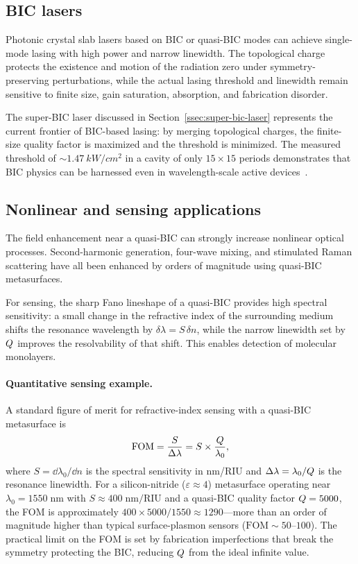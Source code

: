 \subsection{BIC lasers}
\label{ssec:bic-lasers}

Photonic crystal slab lasers based on BIC or quasi-BIC modes can achieve
single-mode lasing with high power and narrow linewidth. The topological
charge protects the existence and motion of the radiation zero under
symmetry-preserving perturbations, while the actual lasing threshold and
linewidth remain sensitive to finite size, gain saturation, absorption,
and fabrication disorder.

The super-BIC laser discussed in Section~\ref{ssec:super-bic-laser}
represents the current frontier of BIC-based lasing: by merging
topological charges, the finite-size quality factor is maximized
and the threshold is minimized. The measured threshold of
$\sim\SI{1.47}{kW/cm^2}$ in a cavity of only $15 \times 15$ periods
demonstrates that BIC physics can be harnessed even in wavelength-scale
active devices~\cite{hwang2021ultralow}.

\subsection{Nonlinear and sensing applications}
\label{ssec:bic-applications}

The field enhancement near a quasi-BIC can strongly increase
nonlinear optical processes. Second-harmonic generation, four-wave
mixing, and stimulated Raman scattering have all been enhanced by orders
of magnitude using quasi-BIC metasurfaces.

For sensing, the sharp Fano lineshape of a quasi-BIC provides high
spectral sensitivity: a small change in the refractive index of the
surrounding medium shifts the resonance wavelength by
$\delta\lambda=S\,\delta n$, while the narrow linewidth set by $Q$
improves the resolvability of that shift. This enables detection of
molecular monolayers.

\paragraph{Quantitative sensing example.}
A standard figure of merit for refractive-index sensing with a
quasi-BIC metasurface is
\begin{equation}
 \mathrm{FOM} = \frac{S}{\Delta\lambda} = S \times \frac{Q}{\lambda_0},
 \label{eq:bic-fom}
\end{equation}
where $S = \dd\lambda_0/\dd n$ is the spectral sensitivity in nm/RIU
and $\Delta\lambda = \lambda_0/Q$ is the resonance linewidth.
For a silicon-nitride ($\varepsilon \approx 4$) metasurface operating
near $\lambda_0 = 1550\;\mathrm{nm}$ with $S \approx 400\;\mathrm{nm/RIU}$
and a quasi-BIC quality factor $Q = 5000$, the FOM is approximately
$400 \times 5000/1550 \approx 1290$---more than an order of magnitude
higher than typical surface-plasmon sensors ($\mathrm{FOM} \sim 50$--$100$).
The practical limit on the FOM is set by fabrication imperfections
that break the symmetry protecting the BIC, reducing $Q$ from
the ideal infinite value.

